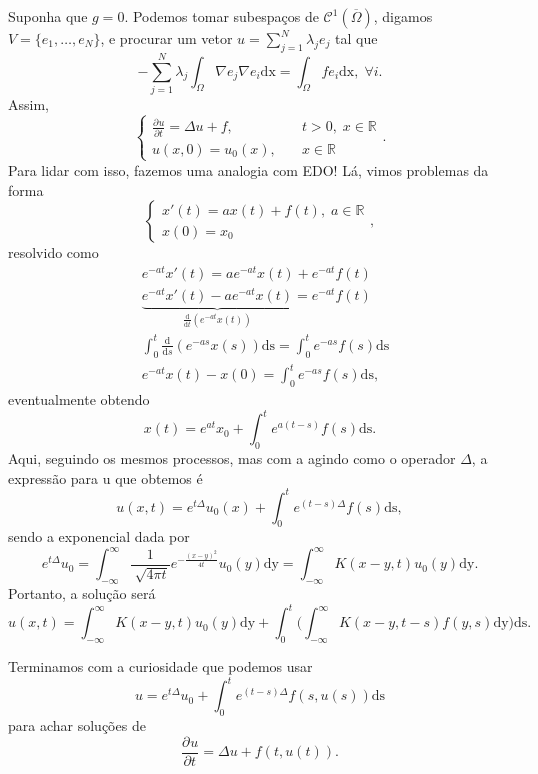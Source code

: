 \documentclass[../pde_notes.tex]{subfiles}
\begin{document}
Suponha que \(g = 0\). Podemos tomar subespaços de \(\mathcal{C}^{1}(\overline{\Omega })\), digamos \(V = \{e_1, \dotsc , e_{N}\}\), e procurar um vetor \(u = \sum\limits_{j=1}^{N}\lambda_{j}e_{j}\) tal que
\[
	-\sum\limits_{j=1}^{N}\lambda_{j}\int_{\Omega }^{}\nabla e_{j}\nabla e_{i} \mathrm{dx} = \int_{\Omega }^{}fe_{i} \mathrm{dx},\; \forall i.
\]
Assim,
\[
	\left\{\begin{array}{ll}
		\frac{\partial^{}u}{\partial t^{}} = \Delta u + f, & \quad t > 0,\; x\in \mathbb{R} \\
		u(x,0) = u_{0}(x),                                 & \quad x\in \mathbb{R}
	\end{array}\right..
\]
Para lidar com isso, fazemos uma analogia com EDO! Lá, vimos problemas da forma
\[
	\left\{\begin{array}{ll}
		x'(t) = ax(t) + f(t),\; a\in \mathbb{R} \\
		x(0) = x_{0}
	\end{array}\right.,
\]
resolvido como
\begin{align*}
	 & e^{-at}x'(t) = ae^{-at}x(t) + e^{-at}f(t)                                                                  \\
	 & \underbrace{e^{-at}x'(t) - ae^{-at}x(t)}_{\frac{\mathrm{d}}{\mathrm{d}t} (e^{-at}x(t))} = e^{-at}f(t)      \\
	 & \int_{0}^{t}\frac{\mathrm{d}}{\mathrm{d}s} (e^{-as}x(s)) \mathrm{ds} = \int_{0}^{t}e^{-as}f(s) \mathrm{ds} \\
	 & e^{-at}x(t) - x(0) = \int_{0}^{t}e^{-as}f(s) \mathrm{ds},
\end{align*}
eventualmente obtendo
\[
	x(t) = e^{at}x_{0} + \int_{0}^{t}e^{a(t-s)}f(s) \mathrm{ds}.
\]
Aqui, seguindo os mesmos processos, mas com a agindo como o operador \(\Delta \), a expressão para u que obtemos é
\[
	u(x, t) = e^{t\Delta }u_{0}(x) + \int_{0}^{t}e^{(t-s)\Delta }f(s) \mathrm{ds},
\]
sendo a exponencial dada por
\[
	e^{t\Delta }u_{0} = \int_{-\infty}^{\infty}\frac{1}{\sqrt[]{4\pi t}}e^{-\frac{(x-y)^{2}}{4t}}u_{0}(y) \mathrm{dy} = \int_{-\infty}^{\infty}K(x-y, t)u_{0}(y) \mathrm{dy}.
\]
Portanto, a solução será
\[
	u(x, t) = \int_{-\infty}^{\infty}K(x-y, t)u_{0}(y) \mathrm{dy} + \int_{0}^{t}\biggl(\int_{-\infty}^{\infty}K(x-y, t-s)f(y, s) \mathrm{dy}\biggr) \mathrm{ds}.
\]

Terminamos com a curiosidade que podemos usar
\[
	u = e^{t\Delta }u_{0} + \int_{0}^{t}e^{(t-s)\Delta }f(s, u(s)) \mathrm{ds}
\]
para achar soluções de
\[
	\frac{\partial^{}u}{\partial t^{}} = \Delta u + f(t, u(t)).
\]
\end{document}
